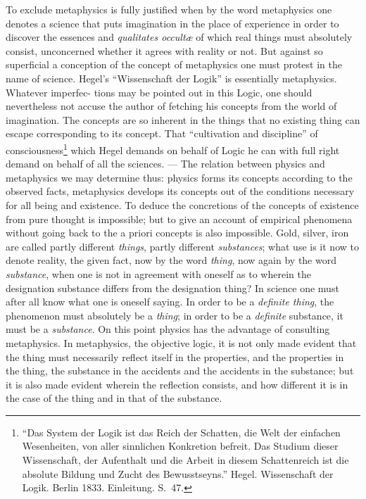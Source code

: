 \documentclass[12pt]{article}
\begin{document}
To exclude metaphysics is fully justified when by the word metaphysics one
denotes a science that puts imagination in the place of experience in order
to discover the essences and \textit{qualitates occultæ} of which real
things must absolutely consist, unconcerned whether it agrees with reality
or not. But against so superficial a conception of the concept of
metaphysics one must protest in the name of science. Hegel's
``Wissenschaft der Logik'' is essentially metaphysics. Whatever imperfec-
tions may be pointed out in this Logic, one should nevertheless not accuse
the author of fetching his concepts from the world of imagination. The
concepts are so inherent in the things that no existing thing can escape
corresponding to its concept. That ``cultivation and discipline'' of
consciousness\footnote{``Das System der Logik ist das Reich der Schatten,
die Welt der einfachen Wesenheiten, von aller sinnlichen Konkretion befreit.
Das Studium dieser Wissenschaft, der Aufenthalt und die Arbeit in diesem
Schattenreich ist die absolute Bildung und Zucht des Bewusstseyns.'' Hegel.
Wissenschaft der Logik. Berlin 1833. Einleitung. S.\ 47.} which Hegel
demands on behalf of Logic he can with full right demand on behalf of all
the sciences. --- The relation between physics and metaphysics we may
determine thus: physics forms its concepts according to the observed facts,
metaphysics develops its concepts out of the conditions necessary for all
being and existence. To deduce the concretions of the concepts of existence
from pure thought is impossible; but to give an account of empirical
phenomena without going back to the a priori concepts is also impossible.
Gold, silver, iron are called partly different \emph{things}, partly
different \emph{substances}; what use is it now to denote reality, the given
fact, now by the word \emph{thing}, now again by the word \emph{substance},
when one is not in agreement with oneself as to wherein the designation
substance differs from the designation thing? In science one must after all
know what one is oneself saying. In order to be a \emph{definite thing}, the
phenomenon must absolutely be a \emph{thing}; in order to be a \emph{definite}
substance, it must be a \emph{substance}. On this point physics has the
advantage of consulting metaphysics. In metaphysics, the objective logic, it
is not only made evident that the thing must necessarily reflect itself in
the properties, and the properties in the thing, the substance in the
accidents and the accidents in the substance; but it is also made evident
wherein the reflection consists, and how different it is in the case of the
thing and in that of the substance.
\end{document}

